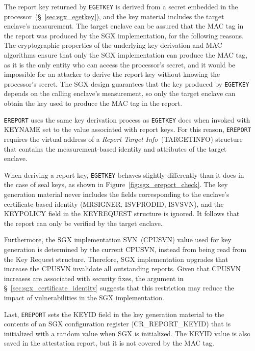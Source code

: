 The report key returned by \texttt{EGETKEY} is derived from a secret embedded
in the processor~(\S~\ref{sec:sgx_egetkey}), and the key material includes the
target enclave's measurement. The target enclave can be assured that the MAC
tag in the report was produced by the SGX implementation, for the following
reasons. The cryptographic properties of the underlying key derivation and
MAC algorithms ensure that only the SGX implementation can produce the MAC tag,
as it is the only entity who can access the processor's secret, and it would be
impossible for an attacker to derive the report key without knowing the
processor's secret. The SGX design guarantees that the key produced by
\texttt{EGETKEY} depends on the calling enclave's measurement, so only the
target enclave can obtain the key used to produce the MAC tag in the report.

\texttt{EREPORT} uses the same key derivation process as \texttt{EGETKEY}
does when invoked with KEYNAME set to the value associated with report keys.
For this reason, \texttt{EREPORT} requires the virtual address of a
\textit{Report Target Info}~(TARGETINFO) structure that contains the
measurement-based identity and attributes of the target enclave.


When deriving a report key, \texttt{EGETKEY} behaves slightly differently than
it does in the case of seal keys, as shown in
Figure~\ref{fig:sgx_ereport_check}. The key generation material never includes
the fields corresponding to the enclave's certificate-based identity (MRSIGNER,
ISVPRODID, ISVSVN), and the KEYPOLICY field in the KEYREQUEST structure is
ignored. It follows that the report can only be verified by the target enclave.

Furthermore, the SGX implementation SVN~(CPUSVN) value used for key generation
is determined by the current CPUSVN, instead from being read from the Key
Request structure. Therefore, SGX implementation upgrades that increase the
CPUSVN invalidate all outstanding reports. Given that CPUSVN increases are
associated with security fixes, the argument in
\S~\ref{sec:sgx_certificate_identity} suggests that this restriction may reduce
the impact of vulnerabilities in the SGX implementation.

Last, \texttt{EREPORT} sets the KEYID field in the key generation material to
the contents of an SGX configuration register (CR\_REPORT\_KEYID) that is
initialized with a random value when SGX is initialized. The KEYID value is
also saved in the attestation report, but it is not covered by the MAC tag.



